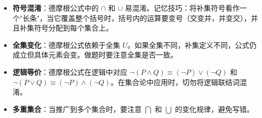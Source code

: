 \begin{trapbox}
\begin{itemize}
    \item \textbf{符号混淆}：德摩根公式中的 $\cap$ 和 $\cup$ 易混淆。记忆技巧：将补集符号看作一个"长条"，当它覆盖整个括号时，括号内的运算要变号（交变并，并变交），并且补集符号分配到每个集合上。
    \item \textbf{全集变化}：德摩根公式依赖于全集 $U$。如果全集不同，补集定义不同，公式仍成立但具体元素会变。做题时要注意全集是否一致。
    \item \textbf{逻辑等价}：德摩根公式在逻辑中对应 $\neg (P \land Q) \equiv (\neg P) \lor (\neg Q)$ 和 $\neg (P \lor Q) \equiv (\neg P) \land (\neg Q)$。在集合论中应用时，切勿将逻辑联结词混淆。
    \item \textbf{多重集合}：当推广到多个集合时，要注意 $\bigcap$ 和 $\bigcup$ 的变化规律，避免写错。
\end{itemize}
\end{trapbox}